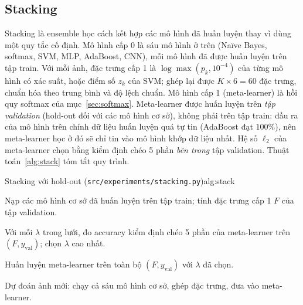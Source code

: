 \subsection{Stacking}
\label{sec:stack}
Stacking \citep{wolpert1992} là ensemble học cách kết hợp các mô hình đã huấn luyện thay vì dùng một quy tắc cố định. Mô hình cấp 0 là sáu mô hình ở trên (Naïve Bayes, softmax, SVM, MLP, AdaBoost, CNN), mỗi mô hình đã được huấn luyện trên tập train. Với mỗi ảnh, đặc trưng cấp 1 là $\log\max(p_k,10^{-4})$ của từng mô hình có xác suất, hoặc điểm số $z_k$ của SVM; ghép lại được $K\times6=60$ đặc trưng, chuẩn hóa theo trung bình và độ lệch chuẩn. Mô hình cấp 1 (meta-learner) là hồi quy softmax của mục~\ref{sec:softmax}. Meta-learner được huấn luyện trên \emph{tập validation} (hold-out đối với các mô hình cơ sở), không phải trên tập train: đầu ra của mô hình trên chính dữ liệu huấn luyện quá tự tin (AdaBoost đạt $100\%$), nên meta-learner học ở đó sẽ chỉ tin vào mô hình khớp dữ liệu nhất. Hệ số $\ell_2$ của meta-learner chọn bằng kiểm định chéo 5 phần \emph{bên trong} tập validation. Thuật toán~\ref{alg:stack} tóm tắt quy trình.

\begin{algo}{Stacking với hold-out (\texttt{src/experiments/stacking.py})}{alg:stack}
\item Nạp các mô hình cơ sở đã huấn luyện trên tập train; tính đặc trưng cấp 1 $F$ của tập validation.
\item Với mỗi $\lambda$ trong lưới, đo accuracy kiểm định chéo 5 phần của meta-learner trên $(F,y_{\text{val}})$; chọn $\lambda$ cao nhất.
\item Huấn luyện meta-learner trên toàn bộ $(F,y_{\text{val}})$ với $\lambda$ đã chọn.
\item Dự đoán ảnh mới: chạy cả sáu mô hình cơ sở, ghép đặc trưng, đưa vào meta-learner.
\end{algo}
